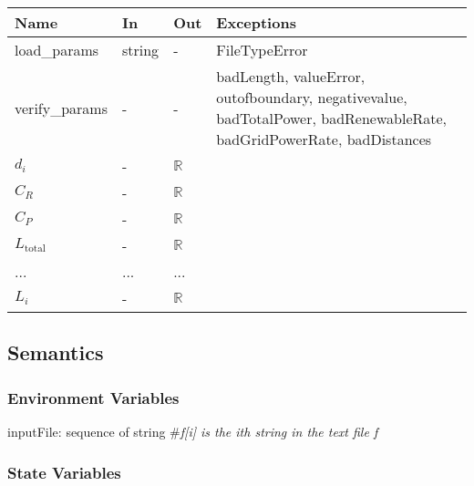 \documentclass[12pt, titlepage]{article}
\begin{document}
\begin{tabular}{p{3cm} p{1cm} p{1cm} >{\raggedright\arraybackslash}p{9cm}}
\toprule
\textbf{Name} & \textbf{In} & \textbf{Out} & \textbf{Exceptions} \\
\midrule
load\_params & string & - &  FileTypeError \\
verify\_params & - & - & badLength, valueError, outofboundary, negativevalue,
                        badTotalPower, badRenewableRate, badGridPowerRate,
                        badDistances\\
$d_i$ & - & $\mathbb{R}$\\
$C_R$ & - & $\mathbb{R}$\\
$C_P$ & - & $\mathbb{R}$\\
$L_\text{total}$ & - & $\mathbb{R}$\\
... & ... & ...\\
$L_i$ & - & $\mathbb{R}$ \\
\bottomrule
\end{tabular}

\subsection{Semantics}

\subsubsection{Environment Variables}

inputFile: sequence of string \#\textit{f[i] is the ith string in the text file f}\\ 

\subsubsection{State Variables}
\end{document}
